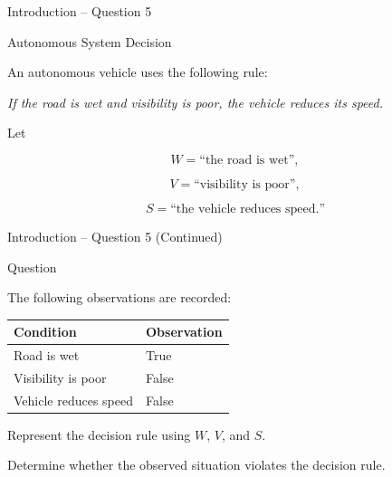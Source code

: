 \begin{frame}{Introduction -- Question 5}

\begin{block}{Autonomous System Decision}

An autonomous vehicle uses the following rule:

\begin{center}
\textit{If the road is wet and visibility is poor, the vehicle reduces
its speed.}
\end{center}

Let

\[
W=\text{``the road is wet''},
\]

\[
V=\text{``visibility is poor''},
\]

\[
S=\text{``the vehicle reduces speed.''}
\]

\end{block}

\end{frame}


\begin{frame}{Introduction -- Question 5 (Continued)}

\begin{block}{Question}

The following observations are recorded:

\begin{center}
\begin{tabular}{ll}
\toprule
\textbf{Condition} & \textbf{Observation}\\
\midrule
Road is wet & True\\
Visibility is poor & False\\
Vehicle reduces speed & False\\
\bottomrule
\end{tabular}
\end{center}

Represent the decision rule using $W$, $V$, and $S$.

Determine whether the observed situation violates the decision rule.

\end{block}

\end{frame}


